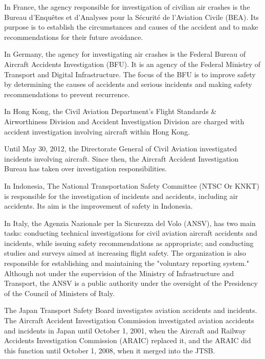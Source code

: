 \documentclass[a4paper, 10pt]{article}
\begin{document}
In France, the agency responsible for investigation of civilian air crashes is the Bureau d'Enquêtes et d'Analyses pour la Sécurité de l'Aviation Civile (BEA). Its purpose is to establish the circumstances and causes of the accident and to make recommendations for their future avoidance.\par

In Germany, the agency for investigating air crashes is the Federal Bureau of Aircraft Accidents Investigation (BFU). It is an agency of the Federal Ministry of Transport and Digital Infrastructure. The focus of the BFU is to improve safety by determining the causes of accidents and serious incidents and making safety recommendations to prevent recurrence.\par

In Hong Kong, the Civil Aviation Department's Flight Standards \& Airworthiness Division and Accident Investigation Division are charged with accident investigation involving aircraft within Hong Kong.\par

Until May 30, 2012, the Directorate General of Civil Aviation investigated incidents involving aircraft. Since then, the Aircraft Accident Investigation Bureau has taken over investigation responsibilities.\par

In Indonesia, The National Transportation Safety Committee (NTSC Or KNKT) is responsible for the investigation of incidents and accidents, including air accidents. Its aim is the improvement of safety in Indonesia.\par

In Italy, the Agenzia Nazionale per la Sicurezza del Volo (ANSV), has two main tasks: conducting technical investigations for civil aviation aircraft accidents and incidents, while issuing safety recommendations as appropriate; and conducting studies and surveys aimed at increasing flight safety. The organization is also responsible for establishing and maintaining the "voluntary reporting system." Although not under the supervision of the Ministry of Infrastructure and Transport, the ANSV is a public authority under the oversight of the Presidency of the Council of Ministers of Italy.\par

The Japan Transport Safety Board investigates aviation accidents and incidents. The Aircraft Accident Investigation Commission investigated aviation accidents and incidents in Japan until October 1, 2001, when the Aircraft and Railway Accidents Investigation Commission (ARAIC) replaced it, and the ARAIC did this function until October 1, 2008, when it merged into the JTSB.\par
\end{document}
